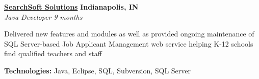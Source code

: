 %
    \headerrow
        {\textbf{\href{http://www.searchsoft.net/}{SearchSoft Solutions}}}
        {\textbf{Indianapolis, IN}}
    \\
    \headerrow
        {\emph{Java Developer}}
        {\emph{9 months}}
    \begin{itemize*}
        \item Delivered new features and modules as well as provided ongoing maintenance of SQL Server-based
                Job Applicant Management web service helping K-12 schools find qualified teachers and staff
    \end{itemize*}

    \hspace{1.0em}
    \textbf{Technologies:} Java, Eclipse, SQL, Subversion, SQL Server
